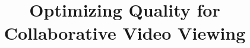 \documentclass{sig-alternate}
\begin{document}
%


\title{Optimizing Quality for Collaborative Video Viewing}
%
%

%
\end{document}
